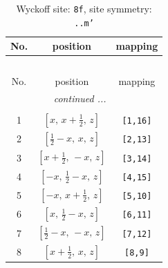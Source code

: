 \documentclass[fleqn,8pt]{jsarticle}
\begin{document}
\begin{longtable}{ccc}
\caption{Wyckoff site: {\tt 8f}, site symmetry: {\tt ..m'}}
 \\
 \hline \hline
No. & position & mapping \\ \hline \endfirsthead

\multicolumn{2}{l}{\tablename\ \thetable{}} \\
 \hline \hline
No. & position & mapping \\ \hline \endhead

 \hline \hline
\multicolumn{2}{r}{\footnotesize\it continued ...} \\ \endfoot

 \hline \hline
\multicolumn{2}{r}{} \\ \endlastfoot

1 & $\left[ x,\, x + \frac{1}{2},\, z \right]$ & {\tt [1,16]} \\ \hline
2 & $\left[ \frac{1}{2} - x,\, x,\, z \right]$ & {\tt [2,13]} \\ \hline
3 & $\left[ x + \frac{1}{2},\, - x,\, z \right]$ & {\tt [3,14]} \\ \hline
4 & $\left[ - x,\, \frac{1}{2} - x,\, z \right]$ & {\tt [4,15]} \\ \hline
5 & $\left[ - x,\, x + \frac{1}{2},\, z \right]$ & {\tt [5,10]} \\ \hline
6 & $\left[ x,\, \frac{1}{2} - x,\, z \right]$ & {\tt [6,11]} \\ \hline
7 & $\left[ \frac{1}{2} - x,\, - x,\, z \right]$ & {\tt [7,12]} \\ \hline
8 & $\left[ x + \frac{1}{2},\, x,\, z \right]$ & {\tt [8,9]} \\
\end{longtable}
\renewcommand{\arraystretch}{1.2}
\end{document}
